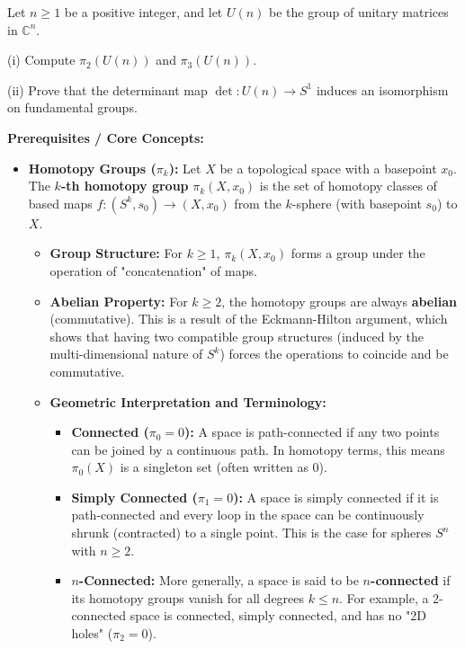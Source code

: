 \begin{exercise}
\label{geometry:2025:3}
Let $n \geq 1$ be a positive integer, and let $U(n)$ be the group of unitary matrices in $\mathbb{C}^{n}$.

(i) Compute $\pi_{2}(U(n))$ and $\pi_{3}(U(n))$.

(ii) Prove that the determinant map $\det : U(n) \to S^{1}$ induces an isomorphism on fundamental groups.
\end{exercise}

\begin{solution}
\textbf{Prerequisites / Core Concepts:}
\begin{itemize}
    \item \textbf{Homotopy Groups ($\pi_k$):} Let $X$ be a topological space with a basepoint $x_0$. The \textbf{$k$-th homotopy group} $\pi_k(X, x_0)$ is the set of homotopy classes of based maps $f: (S^k, s_0) \to (X, x_0)$ from the $k$-sphere (with basepoint $s_0$) to $X$.
    \begin{itemize}
        \item \textbf{Group Structure:} For $k \geq 1$, $\pi_k(X, x_0)$ forms a group under the operation of "concatenation" of maps.
        \item \textbf{Abelian Property:} For $k \geq 2$, the homotopy groups are always \textbf{abelian} (commutative). This is a result of the Eckmann-Hilton argument, which shows that having two compatible group structures (induced by the multi-dimensional nature of $S^k$) forces the operations to coincide and be commutative.
        \item \textbf{Geometric Interpretation and Terminology:}
        \begin{itemize}
            \item \textbf{Connected ($\pi_0 = 0$):} A space is path-connected if any two points can be joined by a continuous path. In homotopy terms, this means $\pi_0(X)$ is a singleton set (often written as $0$).
            \item \textbf{Simply Connected ($\pi_1 = 0$):} A space is simply connected if it is path-connected and every loop in the space can be continuously shrunk (contracted) to a single point. This is the case for spheres $S^n$ with $n \geq 2$.
            \item \textbf{$n$-Connected:} More generally, a space is said to be \textbf{$n$-connected} if its homotopy groups vanish for all degrees $k \leq n$. For example, a 2-connected space is connected, simply connected, and has no "2D holes" ($\pi_2 = 0$).

\end{itemize}
\end{itemize}
\end{itemize}
\end{solution}
